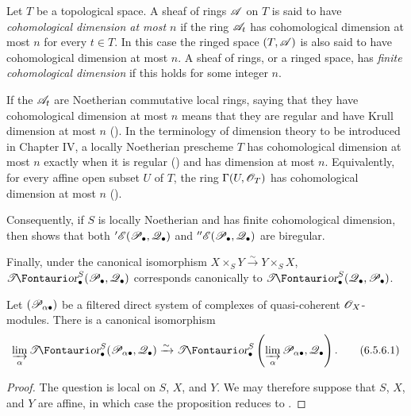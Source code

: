 \begin{env}[6.5.5]
\label{III.6.5.5}
Let $T$ be a topological space.  A sheaf of rings $\mathscr{A}$ on $T$
is said to have \emph{cohomological dimension at most $n$} if the
ring $\mathscr{A}_t$ has cohomological dimension at most $n$ for every
$t\in T$.  In this case the ringed space $(T,\mathscr{A})$ is also said
to have cohomological dimension at most $n$.  A sheaf of rings, or
a ringed space, has \emph{finite cohomological dimension} if this
holds for some integer $n$.

If the $\mathscr{A}_t$ are Noetherian commutative local rings, saying
that they have cohomological dimension at most $n$ means that
they are regular and have Krull dimension at most $n$
().  In the terminology of dimension theory to
be introduced in Chapter IV, a locally Noetherian prescheme $T$ has
cohomological dimension at most $n$ exactly when it is regular
() and has dimension at most $n$.  Equivalently,
for every affine open subset $U$ of $T$, the ring
$\Gamma(U,\mathscr{O}_T)$ has cohomological dimension at most $n$
().

Consequently, if $S$ is locally Noetherian and has finite
cohomological dimension, then  shows that both
$'\mathscr{E}(\mathscr{P}_\bullet,\mathscr{Q}_\bullet)$ and
$''\mathscr{E}(\mathscr{P}_\bullet,\mathscr{Q}_\bullet)$ are biregular.

Finally, under the canonical isomorphism
$X\times_SY\xrightarrow{\sim}Y\times_SX$,
$\shTor_\bullet^S(\sh P_\bullet,\sh Q_\bullet)$ corresponds
canonically to
$\shTor_\bullet^S(\sh Q_\bullet,\sh P_\bullet)$.
\end{env}

\begin{proposition}[6.5.6]
\label{III.6.5.6}
Let $(\mathscr{P}_{\alpha\bullet})$ be a filtered direct system of
complexes of quasi-coherent $\mathscr{O}_X$-modules.  There is a
canonical isomorphism
\[
  \varinjlim_\alpha
  \shTor_\bullet^S(\sh P_{\alpha\bullet},\sh Q_\bullet)
  \xrightarrow{\sim}
  \shTor_\bullet^S
  \left(\varinjlim_\alpha\sh P_{\alpha\bullet},\sh Q_\bullet\right).
  \tag{6.5.6.1}\label{III.6.5.6.1}
\]
\end{proposition}

\begin{proof}
The question is local on $S$, $X$, and $Y$.  We may therefore
suppose that $S$, $X$, and $Y$ are affine, in which case the
proposition reduces to .
\end{proof}

